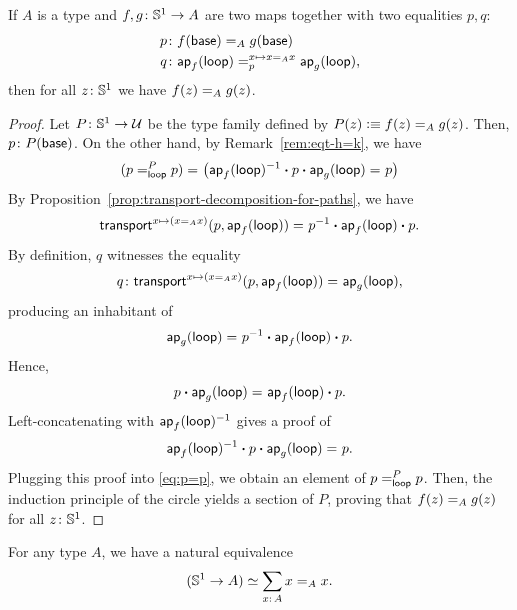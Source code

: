 \begin{lem}\label{lem:S^1-f=g}
    If\/ $A$ is a type and\/ $f, g \colon \sphere^1 \to A$ are two maps together with two equalities\/ $p, q$:
    \begin{align*}
        p&\colon f(\fun{base})\eq Ag(\fun{base})\\
        q&\colon\fun{ap}_f(\fun{loop})
            \eqt{p}{x\mapsto x\eq Ax}
            \fun{ap}_g(\fun{loop}),
    \end{align*}
    then for all\/ $z\colon\sphere^1$ we have\/ $f(z)\mathrel{=_{A}}g(z)$.
\end{lem}

\begin{proof}
    Let $P\colon\sphere^1\to\univ$ be the type family defined by $P(z)\mathrel{\vcentcolon}\equiv f(z)\mathrel{=_{A}}g(z)$. Then, $p\colon P(\fun{base})$. On the other hand, by Remark~\ref{rem:eqt-h=k}, we have
    \begin{equation}\label{eq:p=p}
        (p=_{\mathsf{loop}}^{P}p)
            \mathrel{=_{}}
                \bigl(
                    \mathsf{ap}_f(\mathsf{loop})^{-1}
                        \mathbin{\boldsymbol{\cdot}} p
                        \mathbin{\boldsymbol{\cdot}}\mathsf{ap}_g(\mathsf{loop})
                        \mathrel{=_{}}p
                \big)
    \end{equation}
    By Proposition~\ref{prop:transport-decomposition-for-paths}, we have
    \[
        \mathsf{transport}^{x\mapsto(x\mathrel{=_{A}}x)}(p,\mathsf{ap}_f(\mathsf{loop}))
            \mathrel{=_{}}p^{-1}\mathbin{\boldsymbol{\cdot}} \mathsf{ap}_f(\mathsf{loop})\mathbin{\boldsymbol{\cdot}} p.
    \]
    By definition, $q$ witnesses the equality
    \[
        q\colon\fun{transport}^{x\mapsto(x\eq{A}x)}(p,\fun{ap}_f(\fun{loop}))\eq{}\fun{ap}_g(\fun{loop}),
    \]
    producing an inhabitant of
    \[
        \mathsf{ap}_g(\mathsf{loop})
            \mathrel{=_{}}p^{-1}\mathbin{\boldsymbol{\cdot}} \mathsf{ap}_f(\mathsf{loop})\mathbin{\boldsymbol{\cdot}} p.
    \]
    Hence,
    \[
        p\mathbin{\boldsymbol{\cdot}} \mathsf{ap}_g(\mathsf{loop})
            \mathrel{=_{}}\mathsf{ap}_f(\mathsf{loop})\mathbin{\boldsymbol{\cdot}} p.
    \]
    Left-concatenating with $\mathsf{ap}_f(\mathsf{loop})^{-1}$ gives a proof of
    \[
        \mathsf{ap}_f(\mathsf{loop})^{-1}
        \mathbin{\boldsymbol{\cdot}} p
        \mathbin{\boldsymbol{\cdot}} \mathsf{ap}_g(\mathsf{loop})
        \mathrel{=_{}}p.
    \]
    Plugging this proof into \eqref{eq:p=p}, we obtain an element of $p=_{\mathsf{loop}}^{P}p$. Then, the induction principle of the circle yields a section of $P$, proving that $f(z)\mathrel{=_{A}}g(z)$ for all $z\colon\sphere^1$.
    
\end{proof}

\begin{thm}
    For any type\/ $A$, we have a natural equivalence
    \[
        (\sphere^1\to A)\simeq\sum_{x\colon A}x\eq Ax.
    \]
\end{thm}

